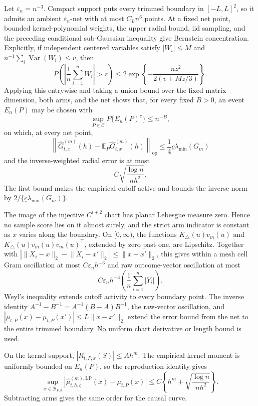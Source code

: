 Let \(\varepsilon_n=n^{-3}\).  Compact support puts every trimmed boundary in \([-L,L]^2\), so it admits an ambient \(\varepsilon_n\)-net with at most \(C_Ln^6\) points.  At a fixed net point, bounded kernel-polynomial weights, the upper radial bound, iid sampling, and the preceding conditional sub-Gaussian inequality give Bernstein concentration.  Explicitly, if independent centered variables satisfy \(|W_i|\leq M\) and \(n^{-1}\sum_i\operatorname{Var}(W_i)\leq v\), then
\[
 P\!\left(\left|\frac1n\sum_{i=1}^nW_i\right|>z\right)
 \leq2\exp\!\left\{-\frac{nz^2}{2(v+Mz/3)}\right\}.
\]
Applying this entrywise and taking a union bound over the fixed matrix dimension, both arms, and the net shows that, for every fixed \(B>0\), an event \(E_n(P)\) may be chosen with
\[
 \sup_{P\in\mathcal C}P\{E_n(P)^c\}\leq n^{-B},
\]
on which, at every net point,
\[
 \left\|\widehat G^{(m)}_{t,x}(h)-\mathbb E_P\widehat G^{(m)}_{t,x}(h)\right\|_{\mathrm{op}}
 \leq\frac14\underline c\lambda_{\min}(G_m)
\]
and the inverse-weighted radial error is at most
\[
 C\sqrt{\frac{\log n}{nh^2}}.
\]
The first bound makes the empirical cutoff active and bounds the inverse norm by \(2/\{\underline c\lambda_{\min}(G_m)\}\).

The image of the injective \(C^{\iota+2}\) chart has planar Lebesgue measure zero.  Hence no sample score lies on it almost surely, and the strict arm indicator is constant as \(x\) varies along the boundary.  On \([0,\infty)\), the functions \(K_\triangle(u)v_m(u)\) and \(K_\triangle(u)v_m(u)v_m(u)^\top\), extended by zero past one, are Lipschitz.  Together with
\(|\lVert X_i-x\rVert_2-\lVert X_i-x'\rVert_2|\leq\lVert x-x'\rVert_2\), this gives within a mesh cell Gram oscillation at most \(C\varepsilon_nh^{-3}\) and raw outcome-vector oscillation at most
\[
 C\varepsilon_nh^{-3}\left(\frac1n\sum_{i=1}^n|Y_i|\right).
\]
Weyl's inequality extends cutoff activity to every boundary point.  The inverse identity \(A^{-1}-B^{-1}=A^{-1}(B-A)B^{-1}\), the raw-vector oscillation, and
\(|\mu_{t,P}(x)-\mu_{t,P}(x')|\leq L\lVert x-x'\rVert_2\) extend the error bound from the net to the entire trimmed boundary.  No uniform chart derivative or length bound is used.

On the kernel support, \(|R_{t,P,x}(S)|\leq Ah^m\).  The empirical kernel moment is uniformly bounded on \(E_n(P)\), so the reproduction identity gives
\[
 \sup_{x\in\mathcal B_{P,\delta}}
 |\widehat\mu^{(m),\mathrm{LP}}_{t,h,\underline c}(x)-\mu_{t,P}(x)|
 \leq C\left\{h^m+\sqrt{\frac{\log n}{nh^2}}\right\}.
\]
Subtracting arms gives the same order for the causal curve.

